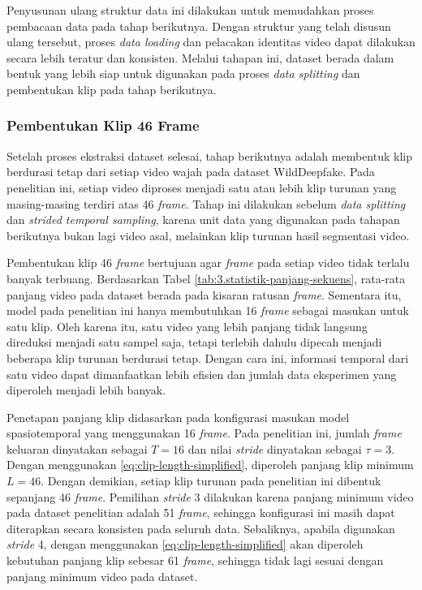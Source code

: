 Penyusunan ulang struktur data ini dilakukan untuk memudahkan proses pembacaan data pada tahap berikutnya. Dengan struktur yang telah disusun ulang tersebut, proses \textit{data loading} dan pelacakan identitas video dapat dilakukan secara lebih teratur dan konsisten. Melalui tahapan ini, dataset berada dalam bentuk yang lebih siap untuk digunakan pada proses \textit{data splitting} dan pembentukan klip pada tahap berikutnya. \par

\subsubsection{Pembentukan Klip 46 Frame}
Setelah proses ekstraksi dataset selesai, tahap berikutnya adalah membentuk klip berdurasi tetap dari setiap video wajah pada dataset WildDeepfake. Pada penelitian ini, setiap video diproses menjadi satu atau lebih klip turunan yang masing-masing terdiri atas 46 \textit{frame}. Tahap ini dilakukan sebelum \textit{data splitting} dan \textit{strided temporal sampling}, karena unit data yang digunakan pada tahapan berikutnya bukan lagi video asal, melainkan klip turunan hasil segmentasi video. \par

Pembentukan klip 46 \textit{frame} bertujuan agar \textit{frame} pada setiap video tidak terlalu banyak terbuang. Berdasarkan Tabel \ref{tab:3.statistik-panjang-sekuens}, rata-rata panjang video pada dataset berada pada kisaran ratusan \textit{frame}. Sementara itu, model pada penelitian ini hanya membutuhkan 16 \textit{frame} sebagai masukan untuk satu klip. Oleh karena itu, satu video yang lebih panjang tidak langsung direduksi menjadi satu sampel saja, tetapi terlebih dahulu dipecah menjadi beberapa klip turunan berdurasi tetap. Dengan cara ini, informasi temporal dari satu video dapat dimanfaatkan lebih efisien dan jumlah data eksperimen yang diperoleh menjadi lebih banyak. \par

Penetapan panjang klip didasarkan pada konfigurasi masukan model spasiotemporal yang menggunakan 16 \textit{frame}. Pada penelitian ini, jumlah \textit{frame} keluaran dinyatakan sebagai $T = 16$ dan nilai \textit{stride} dinyatakan sebagai $\tau = 3$. Dengan menggunakan \ref{eq:clip-length-simplified}, diperoleh panjang klip minimum $L = 46$. Dengan demikian, setiap klip turunan pada penelitian ini dibentuk sepanjang 46 \textit{frame}. Pemilihan \textit{stride} 3 dilakukan karena panjang minimum video pada dataset penelitian adalah 51 \textit{frame}, sehingga konfigurasi ini masih dapat diterapkan secara konsisten pada seluruh data. Sebaliknya, apabila digunakan \textit{stride} 4, dengan menggunakan \ref{eq:clip-length-simplified} akan diperoleh kebutuhan panjang klip sebesar 61 \textit{frame}, sehingga tidak lagi sesuai dengan panjang minimum video pada dataset. \par

